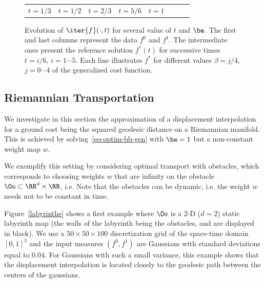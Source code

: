 \begin{figure}[!ht]
\begin{center}
\begin{tabular}{cccccccc}
\hspace{-0.45cm}$t=1/3$&\hspace{-0.45cm}$t=1/2$&
\hspace{-0.45cm}$t=2/3$&\hspace{-0.45cm}$t=5/6$&
\hspace{-0.45cm}$t=1$\vspace{-0.1cm}
\end{tabular}
\caption{\label{fig:generalized_MK} 
Evolution of $\iter{f}(\cdot,t)$ for several value of $t$ and $\be$.
 The first and last columns represent the data $f^0$ and $f^1$. The intermediate ones present the reference solution $f^*(t)$ for successive times $t=i/6$, $i=1\cdots 5$. 
 Each line illustrates $f^*$ for different values $\beta=j/4$, $j=0\cdots 4$ of the generalized cost function. }
\end{center}
\end{figure}


\subsection{Riemannian Transportation}
\label{subsec-riemanian-examples}

We investigate in this section the approximation of a displacement interpolation for a ground cost being the squared geodesic distance on a Riemannian manifold. This is achieved by solving~\eqref{eq-optim-bb-gen} with $\be=1$ but a non-constant weight map $w$.


We exemplify this setting by considering optimal transport with obstacles, which corresponds to choosing weights $w$ that are infinity on the obstacle $\Oo \subset \RR^d \times \RR$, i.e. 
Note that the obstacles can be dynamic, i.e. the weight $w$ needs not to be constant in time. 

Figure~\ref{labyrinthe} shows a first example where $\Oo$ is a 2-D ($d=2$) static labyrinth map (the walls of the labyrinth being the obstacles, and are displayed in black). We use a $50 \times 50 \times 100$ discretization grid of the space-time domain $[0,1]^3$ and the input measures $(f^0,f^1)$ are Gaussians  with standard deviations equal to $0.04$. For Gaussians with such a small variance, this example shows that the displacement interpolation is located  closely to the geodesic path between the centers of the gaussians.


